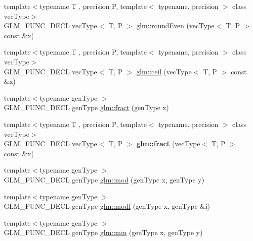 \begin{DoxyCompactItemize}
\item 
{\footnotesize template$<$typename T , precision P, template$<$ typename, precision $>$ class vec\+Type$>$ }\\G\+L\+M\+\_\+\+F\+U\+N\+C\+\_\+\+D\+E\+CL vec\+Type$<$ T, P $>$ \hyperlink{group__core__func__common_ga655598104195a60a950291485e84a97e}{glm\+::round\+Even} (vec\+Type$<$ T, P $>$ const \&x)
\item 
{\footnotesize template$<$typename T , precision P, template$<$ typename, precision $>$ class vec\+Type$>$ }\\G\+L\+M\+\_\+\+F\+U\+N\+C\+\_\+\+D\+E\+CL vec\+Type$<$ T, P $>$ \hyperlink{group__core__func__common_ga9189b2bec45ff301923ea8f8dd157fb8}{glm\+::ceil} (vec\+Type$<$ T, P $>$ const \&x)
\item 
{\footnotesize template$<$typename gen\+Type $>$ }\\G\+L\+M\+\_\+\+F\+U\+N\+C\+\_\+\+D\+E\+CL gen\+Type \hyperlink{group__core__func__common_ga8ba89e40e55ae5cdf228548f9b7639c7}{glm\+::fract} (gen\+Type x)
\item 
\mbox{\label{group__core__func__common_ga950ab967a4406f596b7c6c14af091874}} 
{\footnotesize template$<$typename T , precision P, template$<$ typename, precision $>$ class vec\+Type$>$ }\\G\+L\+M\+\_\+\+F\+U\+N\+C\+\_\+\+D\+E\+CL vec\+Type$<$ T, P $>$ {\bfseries glm\+::fract} (vec\+Type$<$ T, P $>$ const \&x)
\item 
{\footnotesize template$<$typename gen\+Type $>$ }\\G\+L\+M\+\_\+\+F\+U\+N\+C\+\_\+\+D\+E\+CL gen\+Type \hyperlink{group__core__func__common_ga12201563ef902e3b07e0d1d7656efdb1}{glm\+::mod} (gen\+Type x, gen\+Type y)
\item 
{\footnotesize template$<$typename gen\+Type $>$ }\\G\+L\+M\+\_\+\+F\+U\+N\+C\+\_\+\+D\+E\+CL gen\+Type \hyperlink{group__core__func__common_ga85e33f139b8db1b39b590a5713b9e679}{glm\+::modf} (gen\+Type x, gen\+Type \&i)
\item 
{\footnotesize template$<$typename gen\+Type $>$ }\\G\+L\+M\+\_\+\+F\+U\+N\+C\+\_\+\+D\+E\+CL gen\+Type \hyperlink{group__core__func__common_ga2c2bde1cec025b7ddff83c74a1113719}{glm\+::min} (gen\+Type x, gen\+Type y)
\item 
\mbox{\label{group__core__func__common_ga33e66cacf3e991ef1f7d0fce6d073ff9}} 

\end{DoxyCompactItemize}
